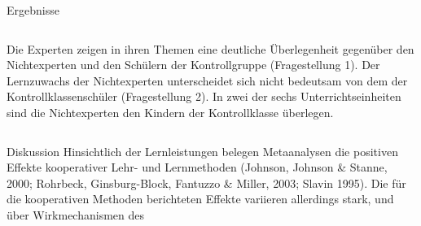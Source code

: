 \begin{block}{Ergebnisse}
\begin{columns}[t,totalwidth=\twocolwid]
\begin{column}{\onecolwid}
\justifying
Die Experten zeigen in ihren Themen eine deutliche Überlegenheit gegenüber den Nichtexperten und den Schülern der Kontrollgruppe (Fragestellung 1). 
Der Lernzuwachs der Nichtexperten unterscheidet sich nicht bedeutsam von dem der Kontrollklassenschüler (Fragestellung 2).
In zwei der sechs Unterrichtseinheiten sind die Nichtexperten den Kindern der Kontrollklasse überlegen. 

\end{column} %
\end{columns} %
\end{block}

\begin{block}{Diskussion}
Hinsichtlich der Lernleistungen  belegen Metaanalysen die positiven Effekte kooperativer Lehr- und Lernmethoden (Johnson, Johnson \& Stanne, 2000; Rohrbeck, Ginsburg-Block, Fantuzzo \& Miller, 2003; Slavin 1995). Die für die kooperativen Methoden berichteten Effekte variieren allerdings stark, und über Wirkmechanismen des 
\end{block}
